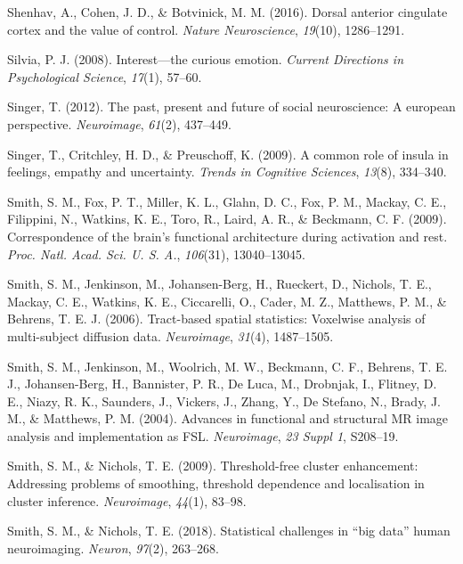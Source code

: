 \documentclass[11pt,american,a4paper,oneside,]{memoir} %
\begin{document}
\leavevmode\hypertarget{ref-shenhav2016dorsal}{}%
Shenhav, A., Cohen, J. D., \& Botvinick, M. M. (2016). Dorsal anterior cingulate cortex and the value of control. \emph{Nature Neuroscience}, \emph{19}(10), 1286--1291.

\leavevmode\hypertarget{ref-silvia2008interest}{}%
Silvia, P. J. (2008). Interest---the curious emotion. \emph{Current Directions in Psychological Science}, \emph{17}(1), 57--60.

\leavevmode\hypertarget{ref-singer2012past}{}%
Singer, T. (2012). The past, present and future of social neuroscience: A european perspective. \emph{Neuroimage}, \emph{61}(2), 437--449.

\leavevmode\hypertarget{ref-singer2009common}{}%
Singer, T., Critchley, H. D., \& Preuschoff, K. (2009). A common role of insula in feelings, empathy and uncertainty. \emph{Trends in Cognitive Sciences}, \emph{13}(8), 334--340.

\leavevmode\hypertarget{ref-Smith2009-kj}{}%
Smith, S. M., Fox, P. T., Miller, K. L., Glahn, D. C., Fox, P. M., Mackay, C. E., Filippini, N., Watkins, K. E., Toro, R., Laird, A. R., \& Beckmann, C. F. (2009). Correspondence of the brain's functional architecture during activation and rest. \emph{Proc. Natl. Acad. Sci. U. S. A.}, \emph{106}(31), 13040--13045.

\leavevmode\hypertarget{ref-Smith2006-sf}{}%
Smith, S. M., Jenkinson, M., Johansen-Berg, H., Rueckert, D., Nichols, T. E., Mackay, C. E., Watkins, K. E., Ciccarelli, O., Cader, M. Z., Matthews, P. M., \& Behrens, T. E. J. (2006). Tract-based spatial statistics: Voxelwise analysis of multi-subject diffusion data. \emph{Neuroimage}, \emph{31}(4), 1487--1505.

\leavevmode\hypertarget{ref-Smith2004-sc}{}%
Smith, S. M., Jenkinson, M., Woolrich, M. W., Beckmann, C. F., Behrens, T. E. J., Johansen-Berg, H., Bannister, P. R., De Luca, M., Drobnjak, I., Flitney, D. E., Niazy, R. K., Saunders, J., Vickers, J., Zhang, Y., De Stefano, N., Brady, J. M., \& Matthews, P. M. (2004). Advances in functional and structural MR image analysis and implementation as FSL. \emph{Neuroimage}, \emph{23 Suppl 1}, S208--19.

\leavevmode\hypertarget{ref-smith2009threshold}{}%
Smith, S. M., \& Nichols, T. E. (2009). Threshold-free cluster enhancement: Addressing problems of smoothing, threshold dependence and localisation in cluster inference. \emph{Neuroimage}, \emph{44}(1), 83--98.

\leavevmode\hypertarget{ref-Smith2018-th}{}%
Smith, S. M., \& Nichols, T. E. (2018). Statistical challenges in ``big data'' human neuroimaging. \emph{Neuron}, \emph{97}(2), 263--268.
\end{document}
